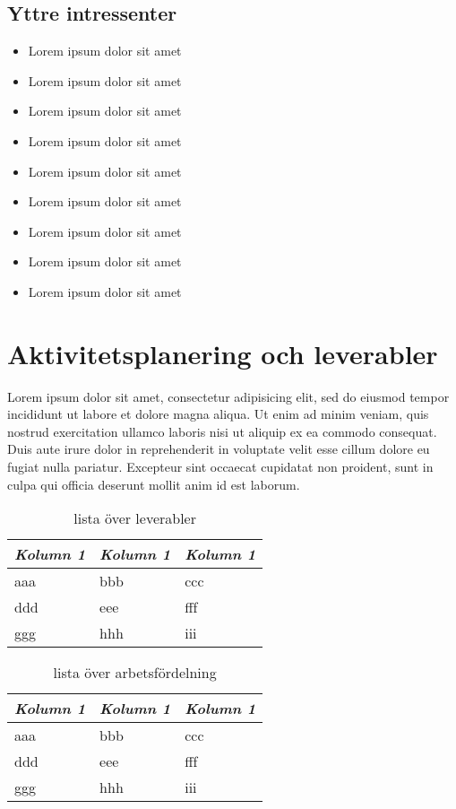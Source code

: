 \documentclass[10pt]{article}
\begin{document}
\subsection{Yttre intressenter}
\noindent
\begin{itemize}
	\setlength\itemsep{0.1em}
	\item Lorem ipsum dolor sit amet
	\item Lorem ipsum dolor sit amet
	\item Lorem ipsum dolor sit amet
	\item Lorem ipsum dolor sit amet
	\item Lorem ipsum dolor sit amet
	\item Lorem ipsum dolor sit amet
	\item Lorem ipsum dolor sit amet
	\item Lorem ipsum dolor sit amet
	\item Lorem ipsum dolor sit amet
\end{itemize}

\section{Aktivitetsplanering och leverabler}
\sloppy
\noindent
Lorem ipsum dolor sit amet, consectetur adipisicing elit, sed do eiusmod tempor incididunt ut labore et dolore magna aliqua. Ut enim ad minim veniam, quis nostrud exercitation ullamco laboris nisi ut aliquip ex ea commodo consequat. Duis aute irure dolor in reprehenderit in voluptate velit esse cillum dolore eu fugiat nulla pariatur. Excepteur sint occaecat cupidatat non proident, sunt in culpa qui officia deserunt mollit anim id est laborum.

\begin{table}[htbp] %
  \begin{center}
    \begin{tabular}{lll}
      \emph{Kolumn 1} & \emph{Kolumn 1} & \emph{Kolumn 1} \\ \hline
      aaa             & bbb             & ccc \\
      ddd             & eee             & fff \\
      ggg             & hhh             & iii \\
    \end{tabular}
  \end{center}
  \caption{lista över leverabler}
\end{table}


\begin{table}[htbp]
  \begin{center}
    \begin{tabular}{lll}
      \emph{Kolumn 1} & \emph{Kolumn 1} & \emph{Kolumn 1} \\ \hline
      aaa             & bbb             & ccc \\
      ddd             & eee             & fff \\
      ggg             & hhh             & iii \\
    \end{tabular}
  \end{center}
  \caption{lista över arbetsfördelning}
\end{table}
\end{document}
